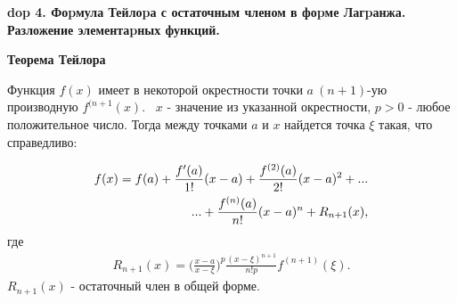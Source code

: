 \textbf{\LARGE dop 4. Фоpмула Тейлоpа с остаточным членом в фоpме Лагpанжа. Разложение элементаpных функций.}

\textbf{Теорема Тейлора}

\mathLet Функция $f(x)$ имеет в некоторой окрестности  точки $a \ (n+1)$-ую производную $f^{(n+1}(x)$. \mathLet \ $x$ - значение из указанной окрестности, $p > 0$ - любое положительное число. Тогда между точками $a$ и $x$ найдется точка $\xi$ такая, что справедливо:

\begin{align}\label{Taylor}
    f(x) = f(a) + \frac{f'(a)}{1!}(x-a) + \frac{f^{(2)}(a)}{2!}(x-a)^2 + ... \notag\\
    ... + \frac{f^{(n)}(a)}{n!}(x-a)^n + R_{n+1}(x),
\end{align}
где
\begin{align}\label{R_n+1_condition}
    R_{n+1}(x) = \bigg(\frac{x-a}{x-\xi}\bigg)^p\frac{(x-\xi)^{n+1}}{n!p}f^{(n+1)}(\xi).
\end{align}
$R_{n+1}(x)$ - остаточный член в общей форме.


